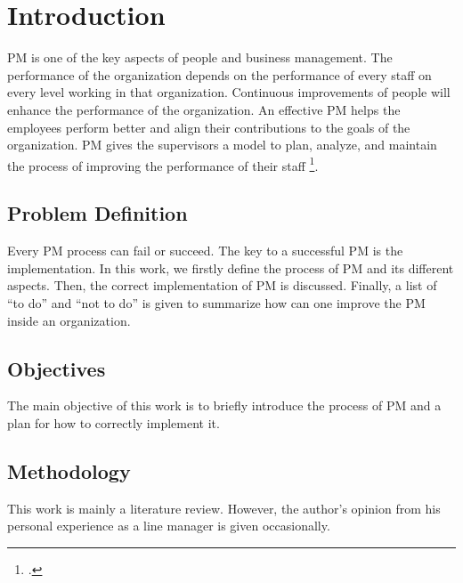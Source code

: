\section{Introduction} \label{introduction}

\ac{PM} is one of the key aspects of people and business management. The performance of the organization depends on the performance of every staff on every level working in that organization. Continuous improvements of people will enhance the performance of the organization. An effective \ac{PM} helps the employees perform better and align their contributions to the goals of the organization. \ac{PM} gives the supervisors a model to plan, analyze, and maintain the process of improving the performance of their staff \footcite[See. ][]{Cadwell2000}.  

\subsection{Problem Definition}
Every \ac{PM} process can fail or succeed. The key to a successful \ac{PM} is the implementation. In this work, we firstly define the process of \ac{PM} and its different aspects. Then, the correct implementation of \ac{PM} is discussed. Finally, a list of \enquote{to do} and \enquote{not to do} is given to summarize how can one improve the \ac{PM} inside an organization.


\subsection{Objectives}
The main objective of this work is to briefly introduce the process of \ac{PM} and a plan for how to correctly implement it.

\subsection{Methodology}
This work is mainly a literature review. However, the author's opinion from his personal experience as a line manager is given occasionally.





